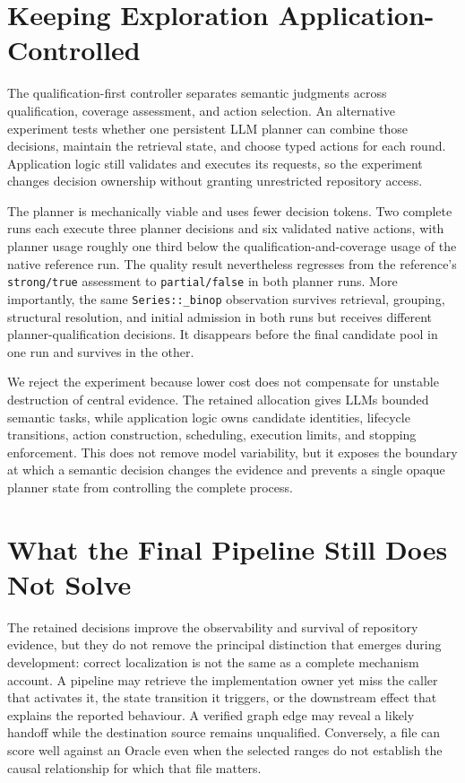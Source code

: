 \section{Keeping Exploration Application-Controlled}\label{sec:keeping-exploration-application-controlled}

The qualification-first controller separates semantic judgments across qualification, coverage assessment, and action selection. An alternative experiment tests whether one persistent LLM planner can combine those decisions, maintain the retrieval state, and choose typed actions for each round. Application logic still validates and executes its requests, so the experiment changes decision ownership without granting unrestricted repository access.

The planner is mechanically viable and uses fewer decision tokens. Two complete runs each execute three planner decisions and six validated native actions, with planner usage roughly one third below the qualification-and-coverage usage of the native reference run. The quality result nevertheless regresses from the reference's \texttt{strong/true} assessment to \texttt{partial/false} in both planner runs. More importantly, the same \texttt{Series::\_binop} observation survives retrieval, grouping, structural resolution, and initial admission in both runs but receives different planner-qualification decisions. It disappears before the final candidate pool in one run and survives in the other.

We reject the experiment because lower cost does not compensate for unstable destruction of central evidence. The retained allocation gives LLMs bounded semantic tasks, while application logic owns candidate identities, lifecycle transitions, action construction, scheduling, execution limits, and stopping enforcement. This does not remove model variability, but it exposes the boundary at which a semantic decision changes the evidence and prevents a single opaque planner state from controlling the complete process.

\section{What the Final Pipeline Still Does Not Solve}\label{sec:what-the-final-pipeline-still-does-not-solve}

The retained decisions improve the observability and survival of repository evidence, but they do not remove the principal distinction that emerges during development: correct localization is not the same as a complete mechanism account. A pipeline may retrieve the implementation owner yet miss the caller that activates it, the state transition it triggers, or the downstream effect that explains the reported behaviour. A verified graph edge may reveal a likely handoff while the destination source remains unqualified. Conversely, a file can score well against an Oracle even when the selected ranges do not establish the causal relationship for which that file matters.

